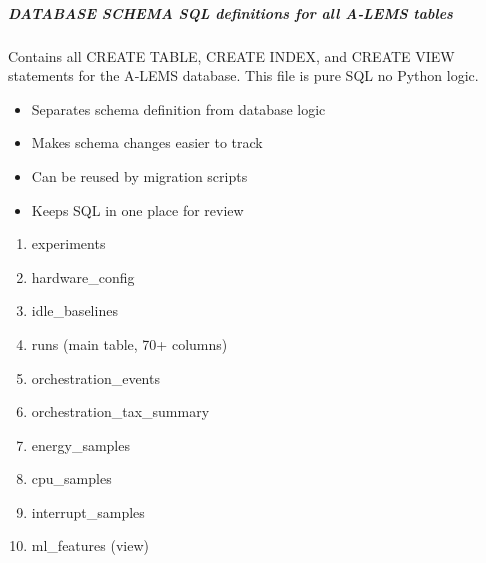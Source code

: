 \documentclass[letterpaper,10pt,english]{sphinxmanual}
\begin{document}
\subparagraph{DATABASE SCHEMA \textendash{} SQL definitions for all A‑LEMS tables}
\label{\detokenize{core.database.schema:database-schema-sql-definitions-for-all-alems-tables}}\begin{description}
\sphinxAtStartPar
Contains all CREATE TABLE, CREATE INDEX, and CREATE VIEW statements
for the A‑LEMS database. This file is pure SQL \textendash{} no Python logic.

\begin{itemize}
\item {} 
\sphinxAtStartPar
Separates schema definition from database logic

\item {} 
\sphinxAtStartPar
Makes schema changes easier to track

\item {} 
\sphinxAtStartPar
Can be reused by migration scripts

\item {} 
\sphinxAtStartPar
Keeps SQL in one place for review

\end{itemize}

\begin{enumerate}
%
\item {} 
\sphinxAtStartPar
experiments

\item {} 
\sphinxAtStartPar
hardware\_config

\item {} 
\sphinxAtStartPar
idle\_baselines

\item {} 
\sphinxAtStartPar
runs (main table, 70+ columns)

\item {} 
\sphinxAtStartPar
orchestration\_events

\item {} 
\sphinxAtStartPar
orchestration\_tax\_summary

\item {} 
\sphinxAtStartPar
energy\_samples

\item {} 
\sphinxAtStartPar
cpu\_samples

\item {} 
\sphinxAtStartPar
interrupt\_samples

\item {} 
\sphinxAtStartPar
ml\_features (view)

\end{enumerate}

\end{description}
\end{document}
